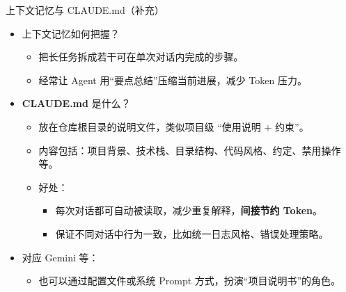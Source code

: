 \documentclass[aspectratio=169]{beamer}
\begin{document}
\begin{frame}{上下文记忆与 CLAUDE.md（补充）}
  \begin{itemize}
    \item 上下文记忆如何把握？
      \begin{itemize}
        \item 把长任务拆成若干可在单次对话内完成的步骤。
        \item 经常让 Agent 用“要点总结”压缩当前进展，减少 Token 压力。
      \end{itemize}
    \item \textbf{CLAUDE.md} 是什么？
      \begin{itemize}
        \item 放在仓库根目录的说明文件，类似项目级 “使用说明 + 约束”。
        \item 内容包括：项目背景、技术栈、目录结构、代码风格、约定、禁用操作等。
        \item 好处：
          \begin{itemize}
            \item 每次对话都可自动被读取，减少重复解释，\textbf{间接节约 Token}。
            \item 保证不同对话中行为一致，比如统一日志风格、错误处理策略。
          \end{itemize}
      \end{itemize}
    \item 对应 Gemini 等：
      \begin{itemize}
        \item 也可以通过配置文件或系统 Prompt 方式，扮演“项目说明书”的角色。
      \end{itemize}
  \end{itemize}
\end{frame}
\end{document}
